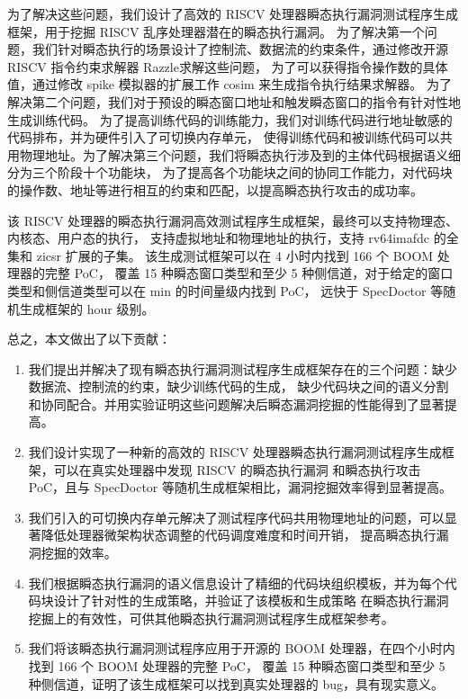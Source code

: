 为了解决这些问题，我们设计了高效的 RISCV 处理器瞬态执行漏洞测试程序生成框架，用于挖掘 RISCV 乱序处理器潜在的瞬态执行漏洞。
为了解决第一个问题，我们针对瞬态执行的场景设计了控制流、数据流的约束条件，通过修改开源 RISCV 指令约束求解器 Razzle\cite{razzle}求解这些问题，
为了可以获得指令操作数的具体值，通过修改 spike 模拟器\cite{riscv-isa-sim}的扩展工作 cosim \cite{riscv-isa-cosim}来生成指令执行结果求解器。
为了解决第二个问题，我们对于预设的瞬态窗口地址和触发瞬态窗口的指令有针对性地生成训练代码。
为了提高训练代码的训练能力，我们对训练代码进行地址敏感的代码排布，并为硬件引入了可切换内存单元，
使得训练代码和被训练代码可以共用物理地址。为了解决第三个问题，我们将瞬态执行涉及到的主体代码根据语义细分为三个阶段十个功能块，
为了提高各个功能块之间的协同工作能力，对代码块的操作数、地址等进行相互的约束和匹配，以提高瞬态执行攻击的成功率。\par

该 RISCV 处理器的瞬态执行漏洞高效测试程序生成框架，最终可以支持物理态、内核态、用户态的执行，
支持虚拟地址和物理地址的执行，支持 rv64imafdc 的全集和 zicsr 扩展的子集\cite{riscv-isa-manual-all}。
该生成测试框架可以在 4 小时内找到 166 个 BOOM 处理器的完整 PoC，
覆盖 15 种瞬态窗口类型和至少 5 种侧信道，对于给定的窗口类型和侧信道类型可以在 min 的时间量级内找到 PoC，
远快于 SpecDoctor\cite{hur2022specdoctor} 等随机生成框架的 hour 级别。\par

总之，本文做出了以下贡献：\par

\begin{enumerate}
    \item 我们提出并解决了现有瞬态执行漏洞测试程序生成框架存在的三个问题：缺少数据流、控制流的约束，缺少训练代码的生成，
缺少代码块之间的语义分割和协同配合。并用实验证明这些问题解决后瞬态漏洞挖掘的性能得到了显著提高。\par
    \item 我们设计实现了一种新的高效的 RISCV 处理器瞬态执行漏洞测试程序生成框架，可以在真实处理器中发现 RISCV 的瞬态执行漏洞
    和瞬态执行攻击 PoC，且与 SpecDoctor 等随机生成框架相比，漏洞挖掘效率得到显著提高。\par
    \item 我们引入的可切换内存单元解决了测试程序代码共用物理地址的问题，可以显著降低处理器微架构状态调整的代码调度难度和时间开销，
提高瞬态执行漏洞挖掘的效率。\par
    \item 我们根据瞬态执行漏洞的语义信息设计了精细的代码块组织模板，并为每个代码块设计了针对性的生成策略，并验证了该模板和生成策略
在瞬态执行漏洞挖掘上的有效性，可供其他瞬态执行漏洞测试程序生成框架参考。\par
    \item 我们将该瞬态执行漏洞测试程序应用于开源的 BOOM 处理器，在四个小时内找到 166 个 BOOM 处理器的完整 PoC，
覆盖 15 种瞬态窗口类型和至少 5 种侧信道，证明了该生成框架可以找到真实处理器的 bug，具有现实意义。\par
\end{enumerate}


